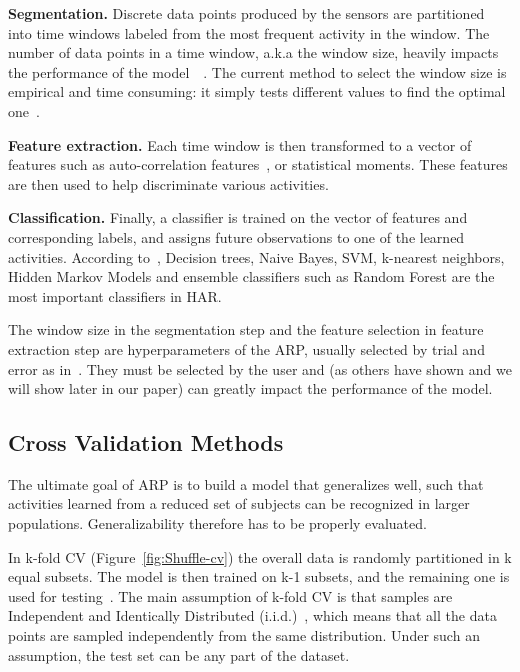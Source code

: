 \documentclass[sigconf]{acmart}
\begin{document}
\noindent\textbf{Segmentation.}
Discrete data points produced by the sensors are partitioned into time 
windows labeled from the most frequent activity in the window. The number of data 
points in a time window, a.k.a the window size, heavily impacts the 
performance of the model~\cite{bulling2014tutorial}~\cite{banos2014window}. The current method 
to select the window size is empirical and time consuming: it simply tests different values to find the optimal one~\cite{bulling2014tutorial}.

\noindent\textbf{Feature extraction.}
Each time window is then transformed to a vector of features such as auto-correlation features~\cite{morris2014recofit}, or statistical 
moments. These features are then used to help discriminate various activities.

\noindent\textbf{Classification.}
Finally, a classifier is trained on the vector of features and corresponding 
labels, and assigns future 
observations to one of the learned activities. According to~\cite{lara2013survey}, Decision trees, Naive Bayes, SVM, k-nearest neighbors, Hidden Markov Models and ensemble classifiers such as Random Forest are the most important classifiers in HAR.

The window size in the segmentation step and the feature selection in feature extraction step are hyperparameters of the ARP, usually 
selected by trial and error as in~\cite{banos2014window}. They must 
be selected by the user and (as others have shown and we will show later in our paper) can greatly impact the performance of the model.

\subsection{Cross Validation Methods}
\label{sub:subjective CV}

The ultimate goal of ARP is to build a model that generalizes well, such that activities learned from a reduced set of subjects can be recognized in larger populations. Generalizability therefore has to be properly evaluated.

In k-fold CV (Figure~\ref{fig:Shuffle-cv}) the overall data is randomly partitioned in k equal subsets. The model is then trained on k-1 subsets, and the remaining one is used for testing~\cite{trevor2009elements}. The main assumption of k-fold CV is that samples are Independent and Identically Distributed (i.i.d.)~\cite{arlot2010survey}, which means that all the data points are sampled independently from the same distribution. Under such an assumption, the test set can be any part of the dataset.
\end{document}
